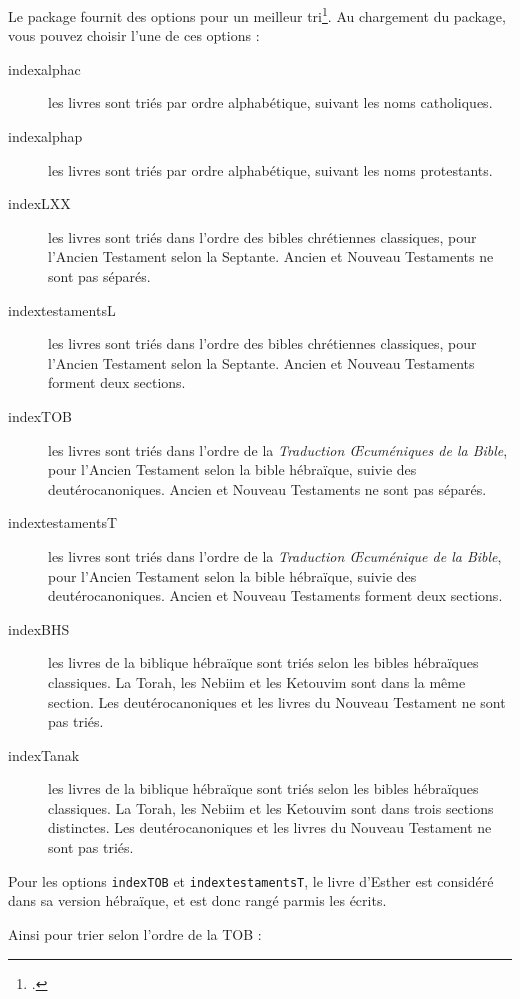 Le package fournit des options pour un meilleur tri\footcite[Pour l'Ancien Testament, les protestants suivent le canon juif pour son contenu mais utilisent l'ordre du canon catholique : voir][]{canons}. Au chargement du package, vous pouvez choisir l'une de ces options :
 \begin{description}
 \item[indexalphac] les livres sont triés par ordre alphabétique, suivant les noms catholiques.
\item[indexalphap] les livres sont triés par ordre alphabétique, suivant les noms protestants.
\item[indexLXX]les livres sont triés dans l'ordre des bibles chrétiennes classiques, pour l'Ancien Testament  selon la Septante. Ancien et Nouveau Testaments ne sont pas séparés.
\item[indextestamentsL] les livres sont triés dans l'ordre des bibles chrétiennes classiques, pour l'Ancien Testament  selon la Septante. Ancien et Nouveau Testaments forment deux sections.
\item[indexTOB] les livres sont triés dans l'ordre de la \emph{Traduction Œcuméniques de la Bible}, pour l'Ancien Testament  selon la bible hébraïque, suivie des deutérocanoniques. Ancien et Nouveau Testaments ne sont pas séparés.
\item[indextestamentsT] les livres sont triés dans l'ordre de la \emph{Traduction Œcuménique de la Bible}, pour l'Ancien Testament  selon la bible hébraïque, suivie des deutérocanoniques. Ancien et Nouveau Testaments forment deux sections.
\item[indexBHS] les livres de la biblique hébraïque sont triés selon les bibles hébraïques classiques. La Torah, les Nebiim et les Ketouvim sont dans la même section. Les deutérocanoniques et les livres du Nouveau Testament ne sont pas triés.
\item[indexTanak] les livres de la biblique hébraïque sont triés selon les bibles hébraïques classiques. La Torah, les Nebiim et les Ketouvim sont dans trois sections distinctes. Les deutérocanoniques et les livres du Nouveau Testament ne sont pas triés.
\end{description}

Pour les options \verb|indexTOB| et \verb|indextestamentsT|, le livre d'Esther est considéré dans sa version hébraïque, et est donc rangé parmis les  écrits.

Ainsi pour trier selon l'ordre de la TOB : 

\begin{latexcode}
\usepackage[indexTOB]{bibleref-french}
\end{latexcode}


